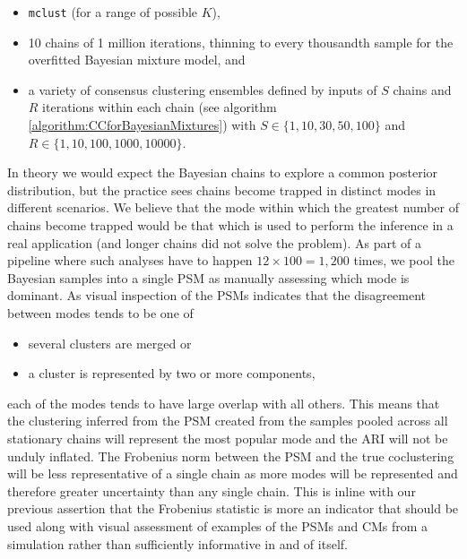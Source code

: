 \documentclass{bioinfo}
\begin{document}
\begin{itemize}
	\item \texttt{mclust} (for a range of possible $K$),
	\item 10 chains of 1 million iterations, thinning to every thousandth sample for the overfitted Bayesian mixture model, and
	\item a variety of consensus clustering ensembles defined by inputs of $S$ chains and $R$ iterations within each chain (see algorithm \ref{algorithm:CCforBayesianMixtures}) with $S \in \{1, 10, 30, 50, 100\}$ and $R \in \{1, 10, 100, 1000, 10000\}$.
\end{itemize}
In theory we would expect the Bayesian chains to explore a common posterior distribution, but the practice sees chains become trapped in distinct modes in different scenarios. We believe that the mode within which the greatest number of chains become trapped would be that which is used to perform the inference in a real application (and longer chains did not solve the problem). As part of a pipeline where such analyses have to happen $12 \times 100 = 1,200$ times, we pool the Bayesian samples into a single PSM as manually assessing which mode is dominant. As visual inspection of the PSMs indicates that the disagreement between modes tends to be one of 
\begin{itemize}
	\item several clusters are merged or
	\item a cluster is represented by two or more components,
\end{itemize}
each of the modes tends to have large overlap with all others. This means that the clustering inferred from the PSM created from the samples pooled across all stationary chains will represent the most popular mode and the ARI will not be unduly inflated. The Frobenius norm between the PSM and the true coclustering will be less representative of a single chain as more modes will be represented and therefore greater uncertainty than any single chain. This is inline with our previous assertion that the Frobenius statistic is more an indicator that should be used along with visual assessment of examples of the PSMs and CMs from a simulation rather than sufficiently informative in and of itself.
\end{document}

